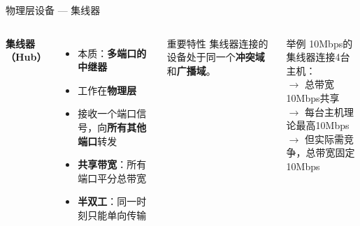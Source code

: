 \documentclass[10pt, aspectratio=169]{beamer}
\begin{document}
\begin{frame}{物理层设备 --- 集线器}
    \begin{columns}[T]
        \textbf{集线器（Hub）}
        \begin{itemize}
            \item 本质：\textbf{多端口的中继器}
            \item 工作在\textbf{物理层}
            \item 接收一个端口信号，向\textbf{所有其他端口}转发
            \item \textbf{共享带宽}：所有端口平分总带宽
            \item \textbf{半双工}：同一时刻只能单向传输
        \end{itemize}
        \vspace{0.3em}
        \begin{alertblock}{重要特性}
            集线器连接的设备处于同一个\textbf{冲突域}和\textbf{广播域}。
        \end{alertblock}
        \begin{exampleblock}{举例}
            10Mbps的集线器连接4台主机：\\
            $\to$ 总带宽10Mbps共享\\
            $\to$ 每台主机理论最高10Mbps\\
            $\to$ 但实际需竞争，总带宽固定10Mbps
        \end{exampleblock}
    \end{columns}
\end{frame}
\end{document}
